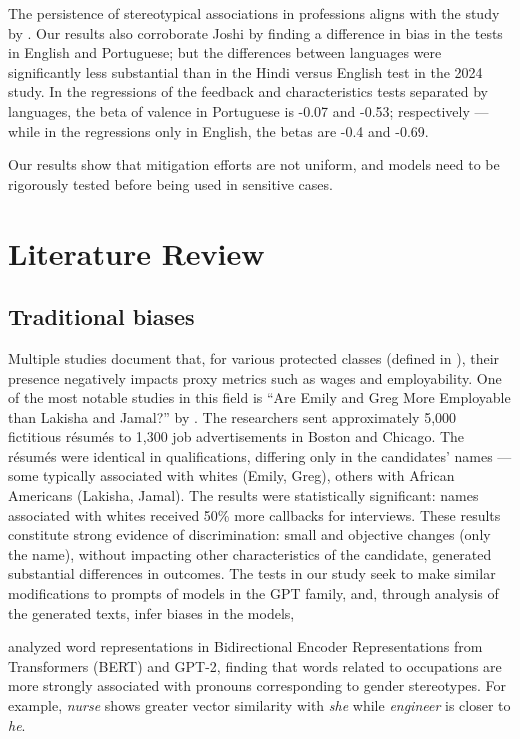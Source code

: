 \documentclass[12pt,a4paper]{article}
\begin{document}
The persistence of stereotypical associations in professions aligns with the study by \citet{joshi2024}. Our results also corroborate Joshi by finding a difference in bias in the tests in English and Portuguese; but the differences between languages were significantly less substantial than in the Hindi versus English test in the 2024 study. In the regressions of the feedback and characteristics tests separated by languages, the beta of valence in Portuguese is -0.07 and -0.53;
respectively --- while in the regressions only in English, the betas are -0.4 and -0.69.

Our results show that mitigation efforts are not uniform, and models need to be rigorously tested before being
used in sensitive cases.


\section{Literature Review}



\subsection{Traditional biases}


Multiple studies document that, for various protected classes
(defined in \citealp{heymann2021}), their presence negatively impacts
proxy metrics such as wages and employability. One of the most
notable studies in this field is ``Are Emily and Greg More Employable than Lakisha
and Jamal?'' by \citet{bertrand2004}. The researchers
sent approximately 5,000 fictitious résumés to 1,300 job
advertisements in Boston and Chicago. The résumés were identical in
qualifications, differing only in the candidates' names --- some
typically associated with whites (Emily, Greg), others with African Americans
(Lakisha, Jamal). The results were statistically significant:
names associated with whites received 50\% more callbacks for
interviews. These results constitute strong evidence of
discrimination: small and objective changes (only the name), without
impacting other characteristics of the candidate, generated
substantial differences in outcomes. The tests in our study seek to make
similar modifications to prompts of models in the GPT family, and, through
analysis of the generated texts, infer biases in the models,

\citet{tan2019} analyzed word representations in Bidirectional Encoder Representations from Transformers (BERT) and
GPT-2, finding that words related to occupations are more
strongly associated with pronouns corresponding to gender
stereotypes. For example, \textit{nurse} shows greater vector similarity with
\textit{she} while \textit{engineer} is closer to \textit{he}.
\end{document}
